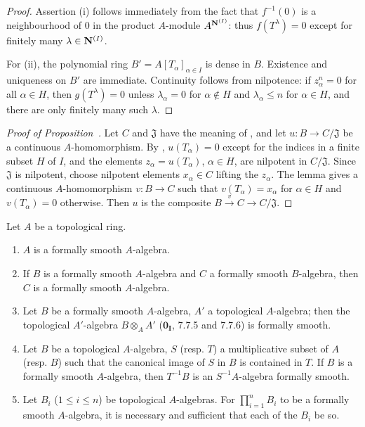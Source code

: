
\begin{proof}
Assertion (i) follows immediately from the fact that $f^{-1}(0)$ is a neighbourhood of $0$ in the product $A$-module $A^{\mathbf{N}^{(I)}}$: thus $f(T^\lambda)=0$ except for finitely many $\lambda\in\mathbf{N}^{(I)}$.

For (ii), the polynomial ring $B'=A[T_\alpha]_{\alpha\in I}$ is dense in $B$.
Existence and uniqueness on $B'$ are immediate.
Continuity follows from nilpotence: if $z_\alpha^n=0$ for all $\alpha\in H$, then $g(T^\lambda)=0$ unless $\lambda_\alpha=0$ for $\alpha\notin H$ and $\lambda_\alpha\leq n$ for $\alpha\in H$, and there are only finitely many such $\lambda$.
\end{proof}

\begin{proof}[Proof of Proposition~{\rm{}}]
Let $C$ and $\mathfrak{J}$ have the meaning of , and let $u:B\to C/\mathfrak{J}$ be a continuous $A$-homomorphism.
By , $u(T_\alpha)=0$ except for the indices in a finite subset $H$ of $I$, and the elements $z_\alpha=u(T_\alpha)$, $\alpha\in H$, are nilpotent in $C/\mathfrak{J}$.
Since $\mathfrak{J}$ is nilpotent, choose nilpotent elements $x_\alpha\in C$ lifting the $z_\alpha$.
The lemma gives a continuous $A$-homomorphism $v:B\to C$ such that $v(T_\alpha)=x_\alpha$ for $\alpha\in H$ and $v(T_\alpha)=0$ otherwise.
Then $u$ is the composite $B\xrightarrow{v}C\to C/\mathfrak{J}$.
\end{proof}

\begin{proposition}[19.3.5]
\label{0.19.3.5}
Let $A$ be a topological ring.
\begin{enumerate}
  \item[(i)] $A$ is a formally smooth $A$-algebra.
  \item[(ii)] If $B$ is a formally smooth $A$-algebra and $C$ a formally smooth $B$-algebra, then $C$ is a formally smooth $A$-algebra.
  \item[(iii)] Let $B$ be a formally smooth $A$-algebra, $A'$ a topological $A$-algebra;
  then the topological $A'$-algebra $B\otimes_A A'$ ($\mathbf{0_I}$, 7.7.5 and 7.7.6) is formally smooth.
  \item[(iv)] Let $B$ be a topological $A$-algebra, $S$ (resp. $T$) a multiplicative subset of $A$ (resp. $B$) such that the canonical image of $S$ in $B$ is contained in $T$.
  If $B$ is a formally smooth $A$-algebra, then $T^{-1}B$ is an $S^{-1}A$-algebra formally smooth.
  \item[(v)] Let $B_i$ ($1\leq i\leq n$) be topological $A$-algebras.
  For $\prod_{i=1}^n B_i$ to be a formally smooth $A$-algebra, it is necessary and sufficient that each of the $B_i$ be so.
\end{enumerate}
\end{proposition}

